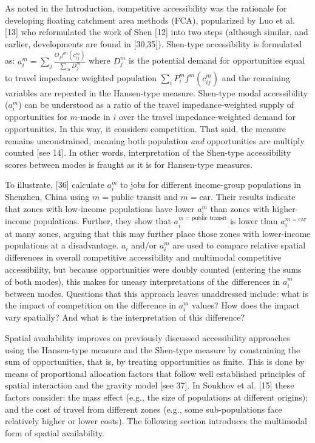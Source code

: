 \documentclass[10pt,letterpaper]{article}
\begin{document}
As noted in the Introduction, competitive accessibility was the
rationale for developing floating catchment area methods (FCA),
popularized by Luo et al. {[}13{]} who reformulated the work of Shen
{[}12{]} into two steps (although similar, and earlier, developments are
found in {[}30,35{]}). Shen-type accessibility is formulated as:
\(a_i^m = \sum_j \frac{O_jf^m(c_{ij}^m)}{\sum_m D_j^m}\) where \(D_j^m\)
is the potential demand for opportunities equal to travel impedance
weighted population \(\sum_i P_i^m f^m(c_{ij}^m)\) and the remaining
variables are repeated in the Hansen-type measure. Shen-type modal
accessibility (\(a_i^m\)) can be understood as a ratio of the travel
impedance-weighted supply of opportunities for \(m\)-mode in \(i\) over
the travel impedance-weighted demand for opportunities. In this way, it
considers competition. That said, the measure remains unconstrained,
meaning both population \emph{and} opportunities are multiply counted
{[}see 14{]}. In other words, interpretation of the Shen-type
accessibility scores between modes is fraught as it is for Hansen-type
measures.

To illustrate, {[}36{]} calculate \(a_i^m\) to jobs for different
income-group populations in Shenzhen, China using
\(m = \text{public transit}\) and \(m=\text{car}\). Their results
indicate that zones with low-income populations have lower \(a_i^m\)
than zones with higher-income populations. Further, they show that
\(a_i^{m=\text{public transit}}\) is lower than \(a_i^{m=\text{car}}\)
at many zones, arguing that this may further place those zones with
lower-income populations at a disadvantage. \(a_i\) and/or \(a_i^m\) are
used to compare relative spatial differences in overall competitive
accessibility and multimodal competitive accessibility, but because
opportunities were doubly counted (entering the sums of both modes),
this makes for uneasy interpretations of the differences in \(a_i^{m}\)
between modes. Questions that this approach leaves unaddressed include:
what is the impact of competition on the difference in \(a_i^m\) values?
How does the impact vary spatially? And what is the interpretation of
this difference?

Spatial availability improves on previously discussed accessibility
approaches using the Hansen-type measure and the Shen-type measure by
constraining the sum of opportunities, that is, by treating
opportunities as finite. This is done by means of proportional
allocation factors that follow well established principles of spatial
interaction and the gravity model {[}see 37{]}. In Soukhov et al.
{[}15{]} these factors consider: the mass effect (e.g., the size of
populations at different origins); and the cost of travel from different
zones (e.g., some sub-populations face relatively higher or lower
costs). The following section introduces the multimodal form of spatial
availability.
\end{document}

